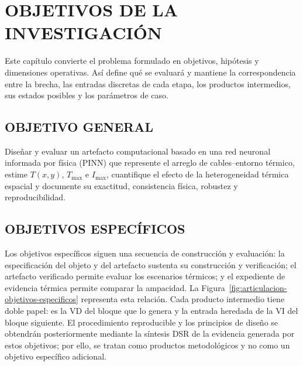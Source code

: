 \documentclass[11pt,a4paper,oneside]{report}
\newcommand{\Tmax}{T_{\max}}
\newcommand{\Imax}{I_{\max}}
\begin{document}
\chapter{OBJETIVOS DE LA INVESTIGACIÓN}
\thispagestyle{empty}

Este capítulo convierte el problema formulado en objetivos, hipótesis y dimensiones operativas. Así define qué se evaluará y mantiene la correspondencia entre la brecha, las entradas discretas de cada etapa, los productos intermedios, sus estados posibles y los parámetros de caso.

\section{OBJETIVO GENERAL}

Diseñar y evaluar un artefacto computacional basado en una red neuronal informada por física (PINN) que represente el arreglo de cables--entorno térmico, estime $T(x,y)$, $\Tmax$ e $\Imax$, cuantifique el efecto de la heterogeneidad térmica espacial y documente su exactitud, consistencia física, robustez y reproducibilidad.

\section{OBJETIVOS ESPECÍFICOS}

Los objetivos específicos siguen una secuencia de construcción y evaluación: la especificación del objeto y del artefacto sustenta su construcción y verificación; el artefacto verificado permite evaluar los escenarios térmicos; y el expediente de evidencia térmica permite comparar la ampacidad. La Figura~\ref{fig:articulacion-objetivos-especificos} representa esta relación. Cada producto intermedio tiene doble papel: es la VD del bloque que lo genera y la entrada heredada de la VI del bloque siguiente. El procedimiento reproducible y los principios de diseño se obtendrán posteriormente mediante la síntesis DSR de la evidencia generada por estos objetivos; por ello, se tratan como productos metodológicos y no como un objetivo específico adicional.
\end{document}
